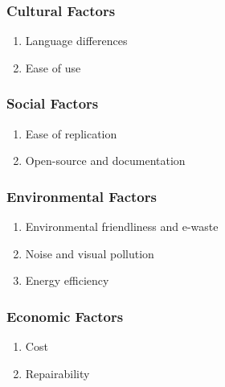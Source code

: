 \subsubsection{Cultural Factors}
\begin{enumerate}
      \item Language differences
      \item Ease of use
\end{enumerate}

\subsubsection{Social Factors}
\begin{enumerate}
      \item Ease of replication
      \item Open-source and documentation
\end{enumerate}

\subsubsection{Environmental Factors}
\begin{enumerate}
      \item Environmental friendliness and e-waste
      \item Noise and visual pollution
      \item Energy efficiency
\end{enumerate}

\subsubsection{Economic Factors}
\begin{enumerate}
      \item Cost
      \item Repairability
\end{enumerate}
